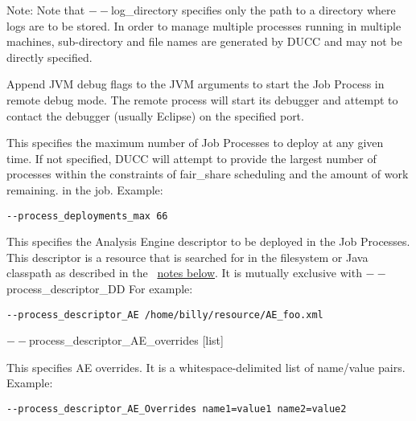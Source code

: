 \begin{description}
             Note: Note that $--$log\_directory specifies only the path to a directory where 
             logs are to be stored. In order to manage multiple processes running in multiple 
             machines, sub-directory and file names are generated by DUCC and may 
             not be directly specified. 

           \item[$--$process\_debug {[debug-port]}] Append JVM debug flags to the JVM
             arguments to start the Job Process in remote debug mode.  The remote process will start
             its debugger and attempt to contact the debugger (usually Eclipse) on the specified
             port.
             
           \item[$--$process\_deployments\_max {[integer]} ]

             This specifies the maximum number of Job Processes to deploy at any given time. If not 
             specified, DUCC will attempt to provide the largest number of processes within the 
             constraints of fair\_share scheduling and the amount of work remaining.
             in the job. Example:
             \begin{verbatim}
--process_deployments_max 66 
             \end{verbatim}


           \item[$--$process\_descriptor\_AE {[descriptor]}  ]

             This specifies the Analysis Engine descriptor to be deployed in the Job Processes. This 
             descriptor is a resource that is searched for in the filesystem or Java classpath as described 
             in the ~\hyperref[par:cli.submit.notes]{notes below}.
             It is mutually exclusive with $--$process\_descriptor\_DD For example: 
             \begin{verbatim}
--process_descriptor_AE /home/billy/resource/AE_foo.xml 
             \end{verbatim}


           \begin{sloppypar}
           \item[$--$process\_descriptor\_AE\_overrides {[list]}  ]

             This specifies AE overrides. It is a whitespace-delimited list of name/value pairs. Example: 
             \begin{verbatim}
--process_descriptor_AE_Overrides name1=value1 name2=value2 
             \end{verbatim}
           \end{sloppypar}             


\end{description}
